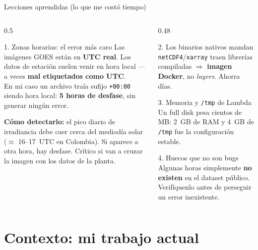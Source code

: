 \documentclass[10pt,aspectratio=169]{beamer}
\begin{document}
\begin{frame}{Lecciones aprendidas (lo que me costó tiempo)}
  \begin{columns}[T]
    \begin{column}{0.5\textwidth}
      \begin{alertblock}{1. Zonas horarias: el error más caro}
        \small
        Las imágenes GOES están en \textbf{UTC real}. Los datos de estación
        suelen venir en hora local --- a veces \textbf{mal etiquetados como UTC}.\\[0.3em]
        En mi caso un archivo traía sufijo \texttt{+00:00} siendo hora local:
        \textbf{5 horas de desfase}, sin generar ningún error.
      \end{alertblock}
      \footnotesize
      \textbf{Cómo detectarlo:} el pico diario de irradiancia debe caer cerca
      del mediodía solar ($\approx$ 16--17~UTC en Colombia). Si aparece a otra
      hora, hay desfase. \textcolor{warnred}{Crítico si van a cruzar la imagen
      con los datos de la planta.}
    \end{column}
    \begin{column}{0.48\textwidth}
      \begin{block}{2. Los binarios nativos mandan}
        \small
        \texttt{netCDF4}/\texttt{xarray} traen librerías compiladas
        $\Rightarrow$ \textbf{imagen Docker}, no \emph{layers}. Ahorra días.
      \end{block}
      \begin{block}{3. Memoria y \texttt{/tmp} de Lambda}
        \small
        Un full disk pesa cientos de MB: 2~GB de RAM y 4~GB de \texttt{/tmp}
        fue la configuración estable.
      \end{block}
      \begin{block}{4. Huecos que no son bugs}
        \small
        Algunas horas simplemente \textbf{no existen} en el dataset público.
        Verifíquenlo antes de perseguir un error inexistente.
      \end{block}
    \end{column}
  \end{columns}
\end{frame}

\section{Contexto: mi trabajo actual}
\end{document}
